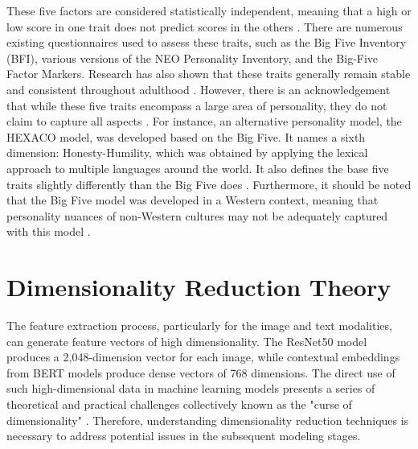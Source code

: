 These five factors are considered statistically independent, meaning that a high or low score in one trait does not predict scores in the others \citep{babcock2020big}. There are numerous existing questionnaires used to assess these traits, such as the Big Five Inventory (BFI), various versions of the NEO Personality Inventory, and the Big-Five Factor Markers. Research has also shown that these traits generally remain stable and consistent throughout adulthood \citep{babcock2020big}. However, there is an acknowledgement that while these five traits encompass a large area of personality, they do not claim to capture all aspects \citep{babcock2020big}. For instance, an alternative personality model, the HEXACO model, was developed based on the Big Five. It names a sixth dimension: Honesty-Humility, which was obtained by applying the lexical approach to multiple languages around the world. It also defines the base five traits slightly differently than the Big Five does \citep{feher2021looking}. Furthermore, it should be noted that the Big Five model was developed in a Western context, meaning that personality nuances of non-Western cultures may not be adequately captured with this model \citep{feher2021looking}.

\section{Dimensionality Reduction Theory}
\label{sec:theory_pca}
The feature extraction process, particularly for the image and text modalities, can generate feature vectors of high dimensionality. The ResNet50 model produces a 2,048-dimension vector for each image, while contextual embeddings from BERT models produce dense vectors of 768 dimensions. The direct use of such high-dimensional data in machine learning models presents a series of theoretical and practical challenges collectively known as the "curse of dimensionality" \citep{bellman1961, bellman1966}. Therefore, understanding dimensionality reduction techniques is necessary to address potential issues in the subsequent modeling stages.

